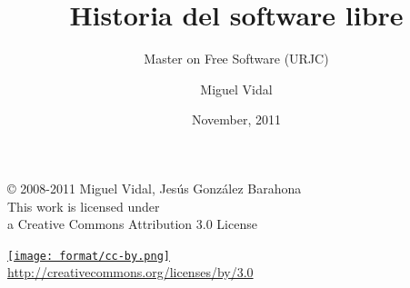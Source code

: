\documentclass{beamer}
\begin{document}
\title{Historia del software libre}
\subtitle{Master on Free Software (URJC)}
\author{Miguel Vidal} 
\date{November, 2011}


\begin{frame}
  \vspace{2cm}
  \begin{flushright}
    {\small \copyright{} 2008-2011 Miguel Vidal, Jesús González Barahona} \\
    \medskip
    {\scriptsize This work is licensed under \\ a Creative Commons Attribution 3.0 License}
  \end{flushright}
  \begin{flushright}
    \href{http://creativecommons.org/licenses/by/3.0/es}{\texttt{[image: format/cc-by.png]}} \\
    {\tiny \url{http://creativecommons.org/licenses/by/3.0}}
  \end{flushright}
\end{frame}%

\usebackgroundtemplate{}





\end{document}
